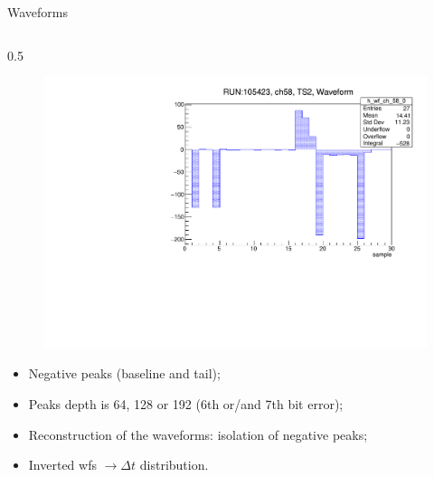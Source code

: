 \documentclass{beamer}[10pt]
\begin{document}
\begin{frame}{Waveforms}
\begin{columns}
\begin{column}{0.5\framewidth}
\begin{figure}[H]
   \includegraphics[width= 1.0\columnwidth]{figures/pdf/waveform_biterror.pdf}
   \label{fig:wffytl}
 \end{figure}
\vspace{-8mm}
\begin{itemize}
\item Negative peaks (baseline and tail);
\item Peaks depth is 64, 128 or 192 (6th or/and 7th bit error);
\item Reconstruction of the waveforms: isolation of negative peaks;
\item Inverted wfs $ \rightarrow \Delta t$ distribution.
\end{itemize}
\end{column}
\end{columns}
\end{frame}
\end{document}
